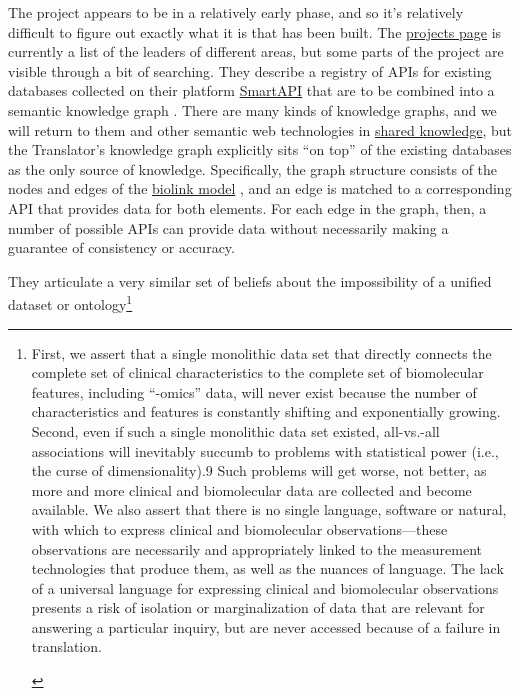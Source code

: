 \documentclass[11pt]{article}
\begin{document}
\begin{multicols}{2}
The project appears to be in a relatively early phase, and so it's
relatively difficult to figure out exactly what it is that has been
built. The
\href{https://web.archive.org/web/20210710012427/https://ncats.nih.gov/translator/projects}{projects
page} is currently a list of the leaders of different areas, but some
parts of the project are visible through a bit of searching. They
describe a registry of APIs for existing databases collected on their
platform \href{https://smart-api.info/portal/translator}{SmartAPI} that
are to be combined into a semantic knowledge graph \cite{consortiumUniversalBiomedicalData2019} . There are many kinds of
knowledge graphs, and we will return to them and other semantic web
technologies in \protect\hyperlink{shared-knowledge}{shared knowledge},
but the Translator's knowledge graph explicitly sits ``on top'' of the
existing databases as the only source of knowledge. Specifically, the
graph structure consists of the nodes and edges of the
\href{https://github.com/biolink/biolink-model}{biolink model} \cite{bruskiewichBiolinkBiolinkmodel2021} , and an edge is matched to a
corresponding API that provides data for both elements. For each edge in
the graph, then, a number of possible APIs can provide data without
necessarily making a guarantee of consistency or accuracy.

They articulate a very similar set of beliefs about the impossibility of
a unified dataset or ontology\footnote{\begin{leftbar}
  First, we assert that a single monolithic data set that directly
  connects the complete set of clinical characteristics to the complete
  set of biomolecular features, including ``-omics'' data, will never
  exist because the number of characteristics and features is constantly
  shifting and exponentially growing. Second, even if such a single
  monolithic data set existed, all-vs.-all associations will inevitably
  succumb to problems with statistical power (i.e., the curse of
  dimensionality).9 Such problems will get worse, not better, as more
  and more clinical and biomolecular data are collected and become
  available. We also assert that there is no single language, software
  or natural, with which to express clinical and biomolecular
  observations---these observations are necessarily and appropriately
  linked to the measurement technologies that produce them, as well as
  the nuances of language. The lack of a universal language for
  expressing clinical and biomolecular observations presents a risk of
  isolation or marginalization of data that are relevant for answering a
  particular inquiry, but are never accessed because of a failure in
  translation.


\end{leftbar}}
\end{multicols}
\end{document}
